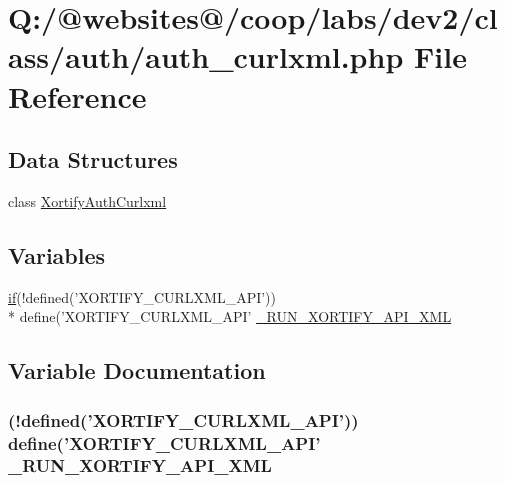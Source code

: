 \hypertarget{auth__curlxml_8php}{\section{Q\-:/@websites@/coop/labs/dev2/class/auth/auth\-\_\-curlxml.php File Reference}
\label{auth__curlxml_8php}
}
\subsection*{Data Structures}
\begin{DoxyCompactItemize}
\item 
class \hyperlink{class_xortify_auth_curlxml}{Xortify\-Auth\-Curlxml}
\end{DoxyCompactItemize}
\subsection*{Variables}
\begin{DoxyCompactItemize}
\item 
\hyperlink{index_8php_ae2ccdf355624402b65fc2226f2a661cd}{if}(!defined('X\-O\-R\-T\-I\-F\-Y\-\_\-\-C\-U\-R\-L\-X\-M\-L\-\_\-\-A\-P\-I')) \\*
define('X\-O\-R\-T\-I\-F\-Y\-\_\-\-C\-U\-R\-L\-X\-M\-L\-\_\-\-A\-P\-I' \hyperlink{auth__curlxml_8php_a89b2355cd04b745621a887cb8f6c96db}{\-\_\-\-R\-U\-N\-\_\-\-X\-O\-R\-T\-I\-F\-Y\-\_\-\-A\-P\-I\-\_\-\-X\-M\-L}
\end{DoxyCompactItemize}


\subsection{Variable Documentation}
\hypertarget{auth__curlxml_8php_a89b2355cd04b745621a887cb8f6c96db}{
\subsubsection[{\-\_\-\-R\-U\-N\-\_\-\-X\-O\-R\-T\-I\-F\-Y\-\_\-\-A\-P\-I\-\_\-\-X\-M\-L}]{ (!defined('X\-O\-R\-T\-I\-F\-Y\-\_\-\-C\-U\-R\-L\-X\-M\-L\-\_\-\-A\-P\-I')) define('X\-O\-R\-T\-I\-F\-Y\-\_\-\-C\-U\-R\-L\-X\-M\-L\-\_\-\-A\-P\-I' \-\_\-\-R\-U\-N\-\_\-\-X\-O\-R\-T\-I\-F\-Y\-\_\-\-A\-P\-I\-\_\-\-X\-M\-L}}\label{auth__curlxml_8php_a89b2355cd04b745621a887cb8f6c96db}
